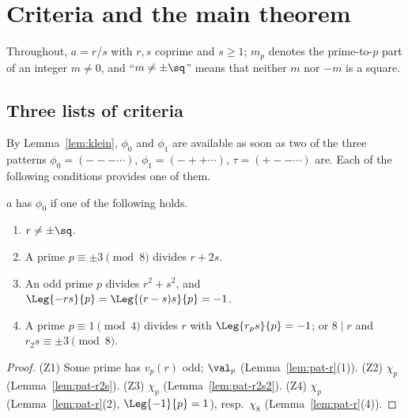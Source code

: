 \chapter{Criteria and the main theorem}
\label{chap:main}

Throughout, $a = r/s$ with $r, s$ coprime and $s \ge 1$; $m_p$ denotes the prime-to-$p$ part of an
integer $m \ne 0$, and ``$m \ne \pm\sq$'' means that neither $m$ nor $-m$ is a square.

\section{Three lists of criteria}

By Lemma~\ref{lem:klein}, $\phi_0$ and $\phi_1$ are available as soon as two of the three
patterns $\phi_0 = ({-}{-}{-}\cdots)$, $\phi_1 = ({-}{+}{+}\cdots)$, $\tau = ({+}{-}{-}\cdots)$
are. Each of the following conditions provides one of them.

\begin{proposition}
  \label{prop:Z}
  \leanok
  $a$ has $\phi_0$ if one of the following holds.
  \begin{enumerate}
    \item[(Z1)] $r \ne \pm\sq$.
    \item[(Z2)] A prime $p \equiv \pm 3 \pmod 8$ divides $r + 2s$.
    \item[(Z3)] An odd prime $p$ divides $r^2 + s^2$, and $\Leg{-rs}{p} = \Leg{(r - s)s}{p} = -1$.
    \item[(Z4)] A prime $p \equiv 1 \pmod 4$ divides $r$ with $\Leg{r_p s}{p} = -1$; or $8 \mid r$
          and $r_2 s \equiv \pm 3 \pmod 8$.
  \end{enumerate}
\end{proposition}
\begin{proof}
  \leanok
  (Z1) Some prime has $v_p(r)$ odd; $\val_p$ (Lemma~\ref{lem:pat-r}(1)). (Z2) $\chi_p$
  (Lemma~\ref{lem:pat-r2s}). (Z3) $\chi_p$ (Lemma~\ref{lem:pat-r2s2}). (Z4) $\chi_p$
  (Lemma~\ref{lem:pat-r}(2), $\Leg{-1}{p} = 1$), resp.\ $\chi_8$ (Lemma~\ref{lem:pat-r}(4)).
\end{proof}

